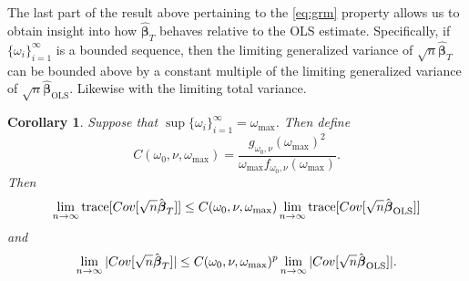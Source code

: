 \documentclass[12pt]{article}
\newtheorem{corollary}{Corollary}
\newcommand{\Cov}[1]{{\rm{Cov}}[ #1 ]}
\newcommand{\tr}{\text{\rm trace}}
\newcommand{\bs}[1]{\boldsymbol #1}
\begin{document}
The last part of the result above pertaining to the \eqref{eq:grm} property allows us to obtain insight into how $\hat{\bs{\beta}}_T$ behaves relative to the OLS estimate. Specifically, if $\{\omega_i\}_{i=1}^\infty$ is a bounded sequence, then the limiting generalized variance of $\sqrt{n}\hat{\bs{\beta}}_T$ can be bounded above by a constant multiple of the limiting generalized variance of $\sqrt{n}\hat{\bs{\beta}}_{\mathrm{OLS}}$. Likewise with the limiting total variance.
\begin{corollary}\label{cor:wcbound}
    Suppose that $\sup\{\omega_i\}_{i=1}^\infty = \omega_{\max}$. Then define
    \begin{equation*}
        C(\omega_0, \nu, \omega_\mathrm{max}) = \frac{g_{\omega_0, \nu}(\omega_{\max})^2}{\omega_{\max} f_{\omega_0, \nu}(\omega_{\max})}.
    \end{equation*}
    Then
    \begin{equation}\label{eq:limbd}
        \lim_{n \rightarrow \infty} \tr[\Cov{\sqrt{n} \hat{\bs{\beta}}_T}] \leq C(\omega_0, \nu, \omega_\mathrm{max}) \lim_{n \rightarrow \infty} \tr[\Cov{\sqrt{n} \hat{\bs{\beta}}_{\mathrm{OLS}}}]
    \end{equation}
    and
    \begin{equation}\label{eq:limbd}
        \lim_{n \rightarrow \infty} |\Cov{\sqrt{n} \hat{\bs{\beta}}_T}| \leq C(\omega_0, \nu, \omega_\mathrm{max})^p \lim_{n \rightarrow \infty} |\Cov{\sqrt{n} \hat{\bs{\beta}}_{\mathrm{OLS}}}|.
    \end{equation}
\end{corollary}
\end{document}
